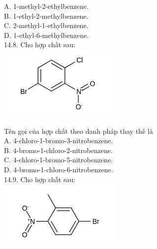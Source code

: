 \documentclass[10pt]{article}
\begin{document}
A. 1-methyl-2-ethylbenzene.\\
B. 1-ethyl-2-methylbenzene.\\
C. 2-methyl-1-ethylbenzene.\\
D. 1-ethyl-6-methylbenzene.\\
14.8. Cho hợp chất sau:\\
\includegraphics{smile-b0d7c9809d565fea7572d02acb351c41c51b0cdb}

Tên gọi của hợp chất theo danh pháp thay thế là\\
A. 4-chloro-1-bromo-3-nitrobenzene.\\
B. 4-bromo-1-chloro-2-nitrobenzene.\\
C. 4-chloro-1-bromo-5-nitrobenzene.\\
D. 4-bromo-1-chloro-6-nitrobenzene.\\
14.9. Cho hợp chất sau:\\
\includegraphics{smile-5a9182a7f6f78f56bf566d625154827f5799be6a}
\end{document}
